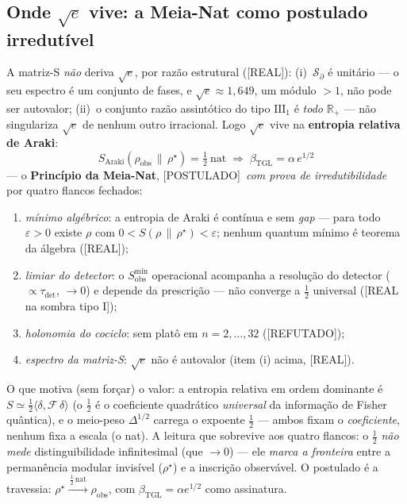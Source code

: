 \documentclass[11pt,a4paper]{article}
\newcommand{\REAL}{\textsf{[REAL]}}
\newcommand{\SOMBRA}{\textsf{[REAL na sombra tipo I]}}
\newcommand{\POST}{\textsf{[POSTULADO]}}
\newcommand{\REF}{\textsf{[REFUTADO]}}
\newcommand{\bTGL}{\beta_{\mathrm{TGL}}}
\begin{document}
\subsection{Onde $\sqrt e$ vive: a Meia-Nat como postulado irredutível}
A matriz-S \emph{não} deriva $\sqrt e$, por razão estrutural (\REAL):
(i)~$\mathcal S_\partial$ é unitário --- o seu espectro é um conjunto de
fases, e $\sqrt e\approx1{,}649$, um módulo $>1$, não pode ser autovalor;
(ii)~o conjunto razão assintótico do tipo $\mathrm{III}_1$ é \emph{todo}
$\mathbb R_+$ --- não singulariza $\sqrt e$ de nenhum outro irracional. Logo
$\sqrt e$ vive na \textbf{entropia relativa de Araki}:
\begin{equation}
\boxed{\;S_{\mathrm{Araki}}(\rho_{\mathrm{obs}}\,\|\,\rho^\star)
=\tfrac12\ \mathrm{nat}
\;\Longrightarrow\;
\bTGL=\alpha\,e^{1/2}\;}
\end{equation}
--- o \textbf{Princípio da Meia-Nat}, \POST\ \emph{com prova de
irredutibilidade} por quatro flancos fechados:
\begin{enumerate}[noitemsep]
\item \emph{mínimo algébrico}: a entropia de Araki é contínua e sem
\emph{gap} --- para todo $\varepsilon>0$ existe $\rho$ com
$0<S(\rho\,\|\,\rho^\star)<\varepsilon$; nenhum quantum mínimo é teorema da
álgebra (\REAL);
\item \emph{limiar do detector}: o $S_{\mathrm{obs}}^{\min}$ operacional
acompanha a resolução do detector ($\propto\tau_{\det}$, $\to0$) e depende
da prescrição --- não converge a $\tfrac12$ universal (\SOMBRA);
\item \emph{holonomia do cociclo}: sem platô em $n=2,\dots,32$ (\REF);
\item \emph{espectro da matriz-S}: $\sqrt e$ não é autovalor (item (i)
acima, \REAL).
\end{enumerate}
O que motiva (sem forçar) o valor: a entropia relativa em ordem dominante é
$S\simeq\tfrac12\langle\delta,\mathcal F\,\delta\rangle$ (o $\tfrac12$ é o
coeficiente quadrático \emph{universal} da informação de Fisher quântica), e
o meio-peso $\Delta^{1/2}$ carrega o expoente $\tfrac12$ --- ambos fixam o
\emph{coeficiente}, nenhum fixa a escala (o nat). A leitura que sobrevive aos
quatro flancos: o $\tfrac12$ \emph{não mede} distinguibilidade infinitesimal
(que $\to0$) --- ele \emph{marca a fronteira} entre a permanência modular
invisível ($\rho^\star$) e a inscrição observável. O postulado é a travessia:
$\rho^\star\xrightarrow{\,\frac12\,\mathrm{nat}\,}\rho_{\mathrm{obs}}$, com
$\bTGL=\alpha e^{1/2}$ como assinatura.
\end{document}
